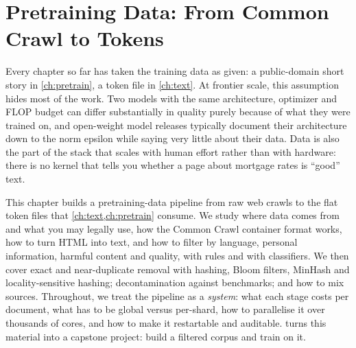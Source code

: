 \chapter{Pretraining Data: From Common Crawl to Tokens}\label{ch:data}

Every chapter so far has taken the training data as given: a public-domain short story in
\cref{ch:pretrain}, a token file in \cref{ch:text}. At frontier scale, this assumption hides
most of the work. Two models with the same architecture, optimizer and FLOP budget can differ
substantially in quality purely because of what they were trained on, and open-weight model
releases typically document their architecture down to the norm epsilon while saying very
little about their data. Data is also the part of the stack that scales with human effort rather
than with hardware: there is no kernel that tells you whether a page about mortgage rates is
``good'' text.

This chapter builds a pretraining-data pipeline from raw web crawls to the flat token files
that \cref{ch:text,ch:pretrain} consume. We study where data comes from and what you may legally
use, how the Common Crawl container format works, how to turn HTML into text, and how to filter
by language, personal information, harmful content and quality, with rules and with classifiers.
We then cover exact and near-duplicate removal with hashing, Bloom filters, MinHash and
locality-sensitive hashing; decontamination against benchmarks; and how to mix sources. Throughout, we treat the pipeline
as a \emph{system}: what each stage costs per document, what has to be global versus per-shard,
how to parallelise it over thousands of cores, and how to make it restartable and auditable.
 turns this material into a capstone project: build a filtered corpus and train on it.

